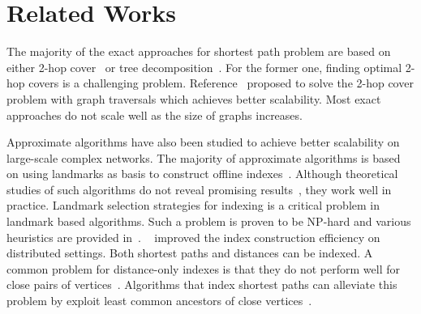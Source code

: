 \section{Related Works}
\label{relatedwork} 

The majority of the exact approaches for shortest path problem are based on either 2-hop cover~\cite{Cohen:2002:RDQ:545381.545503,Akiba:2013:FES:2463676.2465315} or tree decomposition~\cite{Akiba:2012:SQC:2247596.2247614,Wei:2010:TES:1807167.1807181}. For the former one, finding optimal 2-hop covers is a challenging problem. Reference~\cite{Akiba:2013:FES:2463676.2465315} proposed to solve the 2-hop cover problem with graph traversals which achieves better scalability. 
Most exact approaches do not scale well as the size of graphs increases.

Approximate algorithms have also been studied to achieve better scalability on large-scale complex networks. The majority of approximate algorithms is based on using landmarks as basis to construct offline indexes~\cite{Thorup:2005:ADO:1044731.1044732,Goldberg:2005:CSP:1070432.1070455,Potamias:2009:FSP:1645953.1646063,floreskul2014memory,Maier:2011:INS:1993077.1993079, das2010sketch, qi2013toward}. Although theoretical studies of such algorithms do not reveal promising results~\cite{Thorup:2005:ADO:1044731.1044732}, they work well in practice. Landmark selection strategies for indexing is a critical problem in landmark based algorithms. Such a problem is proven to be NP-hard and various heuristics are provided in~\cite{Potamias:2009:FSP:1645953.1646063,6927522}. ~\cite{qi2013toward} improved the index construction efficiency on distributed settings. Both shortest paths and distances can be indexed. A common problem for distance-only indexes is that they do not perform well for close pairs of vertices~\cite{Akiba:2012:SQC:2247596.2247614}. Algorithms that index shortest paths can alleviate this problem by exploit least common ancestors of close vertices~\cite{Gubichev:2010:FAE:1871437.1871503,tretyakov2011fast,6399472}. 

